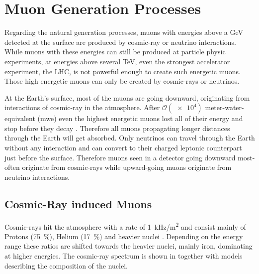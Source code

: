 \chapter{Muon Generation Processes} \label{sec:generation}

Regarding the natural generation processes, muons with energies above a GeV detected at the surface are produced by cosmic-ray or neutrino interactions.
While muons with these energies can still be produced at particle physic experiments, at energies above several TeV, even the strongest accelerator experiment, the LHC, is not powerful enough to create such energetic muons.
Those high energetic muons can only be created by cosmic-rays or neutrinos.

At the Earth's surface, most of the muons are going downward, originating from interactions of cosmic-ray in the atmosphere.
After $\mathcal{O}(\num{e4})$ meter-water-equivalent (mwe) even the highest energetic muons lost all of their energy and stop before they decay \cite{PDG20}.
Therefore all muons propagating longer distances through the Earth will get absorbed.
Only neutrinos can travel through the Earth without any interaction and can convert to their charged leptonic counterpart just before the surface.
Therefore muons seen in a detector going downward most-often originate from cosmic-rays while upward-going muons originate from neutrino interactions.

\section{Cosmic-Ray induced Muons}

Cosmic-rays hit the atmosphere with a rate of \SI{1}{kHz/m^2} and consist mainly of Protons (\SI{75}{\percent}), Helium (\SI{17}{\percent}) and heavier nuclei \cite{Gaisser16CR}.
Depending on the energy range these ratios are shifted towards the heavier nuclei, mainly iron, dominating at higher energies.
The cosmic-ray spectrum is shown in  together with models describing the composition of the nuclei.

